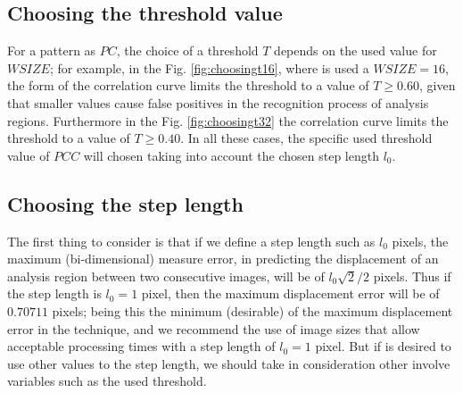 \subsection{Choosing the threshold value}

For a pattern as $PC$, the choice of a threshold $T$
depends on the used value for $WSIZE$; for example, in the Fig. 
\ref{fig:choosingt16}, 
where is used a $WSIZE=16$,  
the form of the correlation curve limits the threshold
to a value of $T \geq 0.60$, given that smaller values
cause false positives in the recognition process of analysis regions.
Furthermore in the Fig. \ref{fig:choosingt32}
the correlation curve limits the threshold
to a value of $T \geq 0.40$. In all these cases, the specific used 
threshold value of $PCC$ will chosen
taking into account the chosen step length $l_0$.


\subsection{Choosing the step length}
\label{subsec:steplength}

The first thing to consider is that if we define a step length such
as $l_0$ pixels, the maximum (bi-dimensional) measure error, 
in predicting the displacement of an analysis region between two consecutive images,
will be of $l_0\sqrt{2}/2$ pixels. Thus if the step length is $l_0=1$ pixel, then
the maximum displacement error will be of $0.70711$ pixels; being this the minimum
(desirable) of the maximum displacement error in the technique, and we recommend
the use of image sizes that allow acceptable processing times with a step length of
$l_0=1$ pixel. But if is desired to use other values to the step length,
we should take in consideration other involve variables such as the used threshold.

